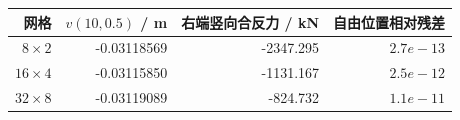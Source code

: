 \begin{tabular}{rrrr}\toprule 网格 & $v(10,0.5)$ / m & 右端竖向合反力 / kN & 自由位置相对残差\\\midrule
$8\times2$ & -0.03118569 & -2347.295 & $2.7e-13$ \\
$16\times4$ & -0.03115850 & -1131.167 & $2.5e-12$ \\
$32\times8$ & -0.03119089 & -824.732 & $1.1e-11$ \\
\bottomrule\end{tabular}
